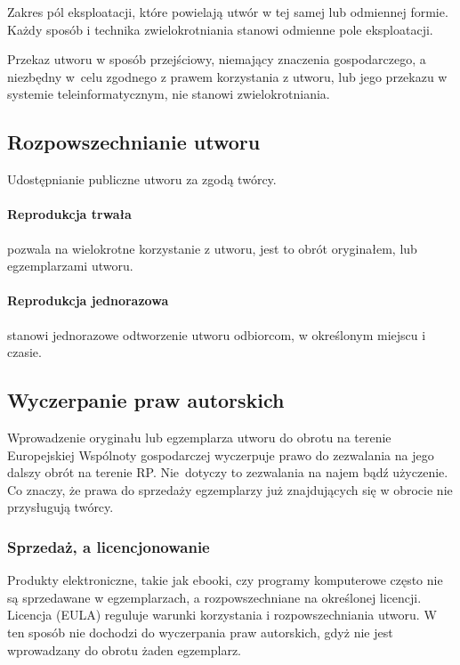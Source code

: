 \documentclass{article}
\begin{document}
Zakres pól eksploatacji, które powielają utwór w tej samej lub odmiennej formie. Każdy sposób i technika zwielokrotniania stanowi odmienne pole eksploatacji.

Przekaz utworu w sposób przejściowy, niemający znaczenia gospodarczego, a niezbędny w~celu zgodnego z prawem korzystania z utworu, lub jego przekazu w systemie teleinformatycznym, nie stanowi zwielokrotniania.

\subsection{Rozpowszechnianie utworu}

Udostępnianie publiczne utworu za zgodą twórcy.

\paragraph{Reprodukcja trwała}

pozwala na wielokrotne korzystanie z utworu, jest to obrót oryginałem, lub egzemplarzami utworu.

\paragraph{Reprodukcja jednorazowa}

stanowi jednorazowe odtworzenie utworu odbiorcom, w określonym miejscu i czasie.

\subsection{Wyczerpanie praw autorskich}

Wprowadzenie oryginału lub egzemplarza utworu do obrotu na terenie Europejskiej Wspólnoty gospodarczej wyczerpuje prawo do zezwalania na jego dalszy obrót na terenie RP. Nie~dotyczy to zezwalania na najem bądź użyczenie.
Co znaczy, że prawa do sprzedaży egzemplarzy już znajdujących się w obrocie nie przysługują twórcy.

\subsubsection{Sprzedaż, a licencjonowanie}

Produkty elektroniczne, takie jak ebooki, czy programy komputerowe często nie są sprzedawane w egzemplarzach, a rozpowszechniane na określonej licencji. Licencja (EULA) reguluje warunki korzystania i rozpowszechniania utworu. W ten sposób nie dochodzi do wyczerpania praw autorskich, gdyż nie jest wprowadzany do obrotu żaden egzemplarz.
\end{document}
